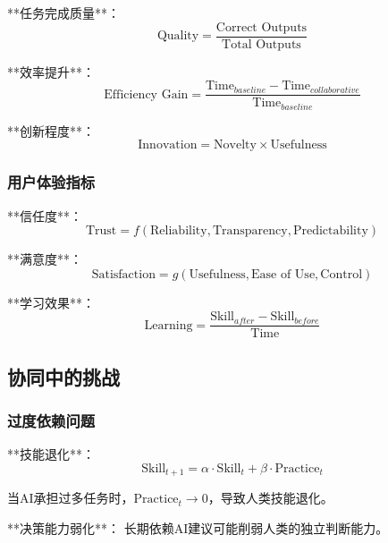 **任务完成质量**：
\begin{equation}
\text{Quality} = \frac{\text{Correct Outputs}}{\text{Total Outputs}}
\end{equation}

**效率提升**：
\begin{equation}
\text{Efficiency Gain} = \frac{\text{Time}_{baseline} - \text{Time}_{collaborative}}{\text{Time}_{baseline}}
\end{equation}

**创新程度**：
\begin{equation}
\text{Innovation} = \text{Novelty} \times \text{Usefulness}
\end{equation}

\subsubsection{用户体验指标}

**信任度**：
\begin{equation}
\text{Trust} = f(\text{Reliability}, \text{Transparency}, \text{Predictability})
\end{equation}

**满意度**：
\begin{equation}
\text{Satisfaction} = g(\text{Usefulness}, \text{Ease of Use}, \text{Control})
\end{equation}

**学习效果**：
\begin{equation}
\text{Learning} = \frac{\text{Skill}_{after} - \text{Skill}_{before}}{\text{Time}}
\end{equation}

\subsection{协同中的挑战}

\subsubsection{过度依赖问题}

**技能退化**：
\begin{equation}
\text{Skill}_{t+1} = \alpha \cdot \text{Skill}_t + \beta \cdot \text{Practice}_t
\end{equation}

当AI承担过多任务时，$\text{Practice}_t \to 0$，导致人类技能退化。

**决策能力弱化**：
长期依赖AI建议可能削弱人类的独立判断能力。

